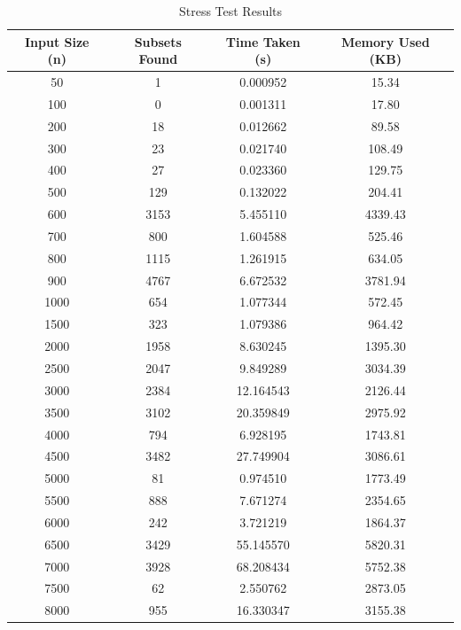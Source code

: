 \documentclass[11pt]{article}
\begin{document}
\thispagestyle{empty} %
\centering
\begin{center}
\renewcommand{\arraystretch}{0.95}
\begin{longtable}{|c|c|c|c|}
\caption{Stress Test Results }
\hline
\textbf{Input Size (n)} & \textbf{Subsets Found} & \textbf{Time Taken (s)} & \textbf{Memory Used (KB)} \\
\hline
50          & 1        & 0.000952  & 15.34 \\
100         & 0        & 0.001311  & 17.80 \\
200         & 18       & 0.012662  & 89.58 \\  
300         & 23       & 0.021740  & 108.49 \\
400         & 27       & 0.023360  & 129.75 \\ 
500         & 129      & 0.132022  & 204.41 \\
600         & 3153     & 5.455110  & 4339.43 \\  
700         & 800      & 1.604588  & 525.46 \\
800         & 1115     & 1.261915  & 634.05 \\ 
900         & 4767     & 6.672532  & 3781.94 \\
1000        & 654      & 1.077344  & 572.45 \\
1500        & 323      & 1.079386  & 964.42 \\
2000        & 1958     & 8.630245  & 1395.30 \\
2500        & 2047     & 9.849289  & 3034.39 \\
3000        & 2384     & 12.164543 & 2126.44 \\
3500        & 3102     & 20.359849 & 2975.92 \\
4000        & 794      & 6.928195  & 1743.81 \\
4500        & 3482     & 27.749904 & 3086.61 \\
5000        & 81       & 0.974510  & 1773.49 \\
5500        & 888      & 7.671274  & 2354.65 \\
6000        & 242      & 3.721219  & 1864.37 \\
6500        & 3429     & 55.145570 & 5820.31 \\
7000        & 3928     & 68.208434 & 5752.38 \\
7500        & 62       & 2.550762  & 2873.05 \\
8000        & 955      & 16.330347 & 3155.38 \\

\end{longtable}
\end{center}
\end{document}
